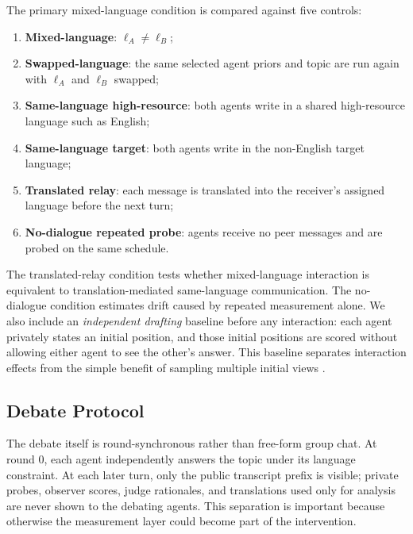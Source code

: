 \documentclass{article}
\begin{document}
The primary mixed-language condition is compared against five controls:
\begin{enumerate}[leftmargin=*]
    \item \textbf{Mixed-language}: $\ell_A \neq \ell_B$;
    \item \textbf{Swapped-language}: the same selected agent priors and topic are run again with $\ell_A$ and $\ell_B$ swapped;
    \item \textbf{Same-language high-resource}: both agents write in a shared high-resource language such as English;
    \item \textbf{Same-language target}: both agents write in the non-English target language;
    \item \textbf{Translated relay}: each message is translated into the receiver's assigned language before the next turn;
    \item \textbf{No-dialogue repeated probe}: agents receive no peer messages and are probed on the same schedule.
\end{enumerate}
The translated-relay condition tests whether mixed-language interaction is equivalent to translation-mediated same-language communication. The no-dialogue condition estimates drift caused by repeated measurement alone. We also include an \emph{independent drafting} baseline before any interaction: each agent privately states an initial position, and those initial positions are scored without allowing either agent to see the other's answer. This baseline separates interaction effects from the simple benefit of sampling multiple initial views \citep{choi2025debateorvote,kaesberg2025votingorconsensus}.

\subsection{Debate Protocol}
\label{sec:protocol}

The debate itself is round-synchronous rather than free-form group chat. At round $0$, each agent independently answers the topic under its language constraint. At each later turn, only the public transcript prefix is visible; private probes, observer scores, judge rationales, and translations used only for analysis are never shown to the debating agents. This separation is important because otherwise the measurement layer could become part of the intervention.
\end{document}
